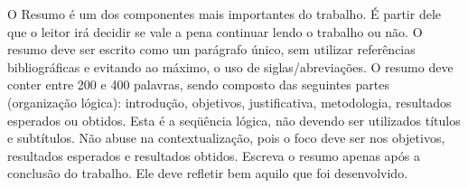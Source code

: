\setlength{\absparsep}{14pt} 
\begin{resumo}
O Resumo é um dos componentes mais importantes do trabalho. É partir dele que o leitor irá decidir se vale a pena continuar lendo o trabalho ou não. O resumo deve ser escrito como um parágrafo único, sem utilizar referências bibliográficas e evitando ao máximo, o uso de siglas/abreviações. O resumo deve conter entre 200 e 400 palavras, sendo composto das seguintes partes (organização lógica): introdução, objetivos, justificativa, metodologia, resultados esperados ou obtidos. Esta é a seqüência lógica, não devendo ser utilizados títulos e subtítulos. Não abuse na contextualização, pois o foco deve ser nos objetivos, resultados esperados e resultados obtidos. Escreva o resumo apenas após a conclusão do trabalho. Ele deve refletir bem aquilo que foi desenvolvido.
\end{resumo}